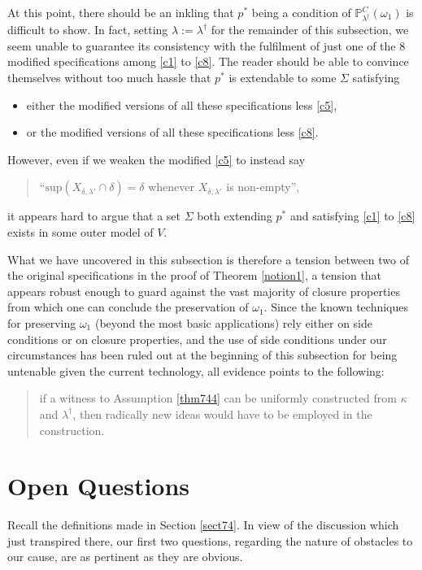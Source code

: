 \documentclass[12pt, twoside]{memoir}
\numberwithin{equation}{section}
\theoremstyle{definition}
\theoremstyle{remark}
\theoremstyle{definition}
\theoremstyle{definition}
\theoremstyle{definition}
\theoremstyle{remark}
\begin{document}
At this point, there should be an inkling that $p^*$ being a condition of $\mathbb{P}^C_{\lambda^{\dagger}}(\omega_1)$ is difficult to show. In fact, setting $\lambda := \lambda^{\dagger}$ for the remainder of this subsection, we seem unable to guarantee its consistency with the fulfilment of just one of the 8 modified specifications among \ref{c1} to \ref{c8}. The reader should be able to convince themselves without too much hassle that $p^*$ is extendable to some $\Sigma$ satisfying 
\begin{itemize}
    \item either the modified versions of all these specifications less \ref{c5},
    \item or the modified versions of all these specifications less \ref{c8}.
\end{itemize}
However, even if we weaken the modified \ref{c5} to instead say
\begin{quote}
    ``$\mathrm{sup}(X_{\delta, \lambda'} \cap \delta) = \delta$ whenever $X_{\delta, \lambda'}$ is non-empty'',
\end{quote}
it appears hard to argue that a set $\Sigma$ both extending $p^*$ and satisfying \ref{c1} to \ref{c8} exists in some outer model of $V$. 

What we have uncovered in this subsection is therefore a tension between two of the original specifications in the proof of Theorem \ref{notion1}, a tension that appears robust enough to guard against the vast majority of closure properties from which one can conclude the preservation of $\omega_1$. Since the known techniques for preserving $\omega_1$ (beyond the most basic applications) rely either on side conditions or on closure properties, and the use of side conditions under our circumstances has been ruled out at the beginning of this subsection for being untenable given the current technology, all evidence points to the following:
\begin{quote}
    if a witness to Assumption \ref{thm744} can be uniformly constructed from $\kappa$ and $\lambda^{\dagger}$, then radically new ideas would have to be employed in the construction.
\end{quote}

\section{Open Questions}

Recall the definitions made in Section \ref{sect74}. In view of the discussion which just transpired there, our first two questions, regarding the nature of obstacles to our cause, are as pertinent as they are obvious. 
\end{document}

